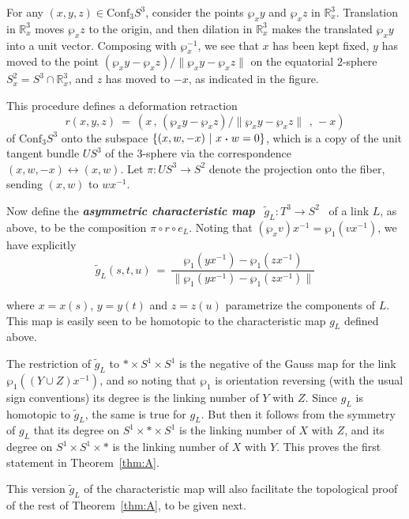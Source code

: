 \documentclass[11pt]{amsart}
\theoremstyle{definition}
\newcommand{\thmref}[1]{Theorem~\ref{#1}}
\newcommand{\itb}{\bfseries\itshape}
\def\br{\mathbb R}
\def\tor{T^3}
\def\conf{\mathrm{Conf}_3S^3}
\def\dt{\,\raisebox{.2ex}{\text{\tiny\textbullet}}\,}
\def\st{\ | \ }
\def\bx{x^{-1}} %
\def\pr{\mathrm{\wp}}
\def\g{\widetilde g}
\begin{document}
For any $(x,y,z)\in\conf$, consider the points $\pr_xy$ and $\pr_xz$ in $\br^3_x$.  Translation in $\br^3_x$ moves $\pr_xz$ to the origin, and then dilation in $\br^3_x$ makes the translated $\pr_xy$ into a unit vector.  Composing with $\pr_x^{-1}$, we see that $x$ has been kept fixed, $y$ has moved to the point $(\pr_xy-\pr_xz)/\| \pr_xy-\pr_xz\|$ on the equatorial $2$-sphere $S^2_x = S^3 \cap \br^3_x$, and $z$ has moved to $-x$, as indicated in the figure.  

This procedure defines a deformation retraction
$$
r(x,y,z) \ = \ (x \, , \, (\pr_xy-\pr_xz)/\| \pr_xy-\pr_xz\|\ \, ,\, -x)
$$
of $\conf$ onto the subspace $\{(x,w,-x) \st x \dt w = 0\}$, which is a copy of the unit tangent bundle $US^3$ of the $3$-sphere via the correspondence $(x,w,-x) \leftrightarrow (x,w)$.  Let $\pi:US^3\to S^2$ denote the projection onto the fiber, sending $(x,w)$ to $w\bx$.



Now define the {\itb asymmetric characteristic map} \ $\g_L: \tor\longrightarrow S^2$ \ of a link $L$, as above, to be the composition $\pi\circ r\circ e_L$.  Noting that $(\pr_xv)\bx = \pr_1(v\bx)$, we have explicitly
\[
\g_L(s,t,u) \ = \ \frac{\pr_1(y\bx)-\pr_1(z\bx)}{\|\pr_1(y\bx)-\pr_1(z\bx)\|}
\]

\noindent where $x = x(s)$, $y = y(t)$ and $z = z(u)$ parametrize the components of $L$.   This map is easily seen to be homotopic to the characteristic map $g_L$ defined above.   

The restriction of $\g_L$ to $*\times S^1\times S^1$ is the negative of the Gauss map for the link $\pr_1((Y\cup Z)\bx)$, and so noting that $\pr_1$ is orientation reversing (with the usual sign conventions) its degree is the linking number of $Y$ with $Z$.  Since  $g_L$  is homotopic to $\g_L$,  the same is true for $g_L$.  But then  it follows from the symmetry of $g_L$ that its degree on $S^1\times * \times S^1$ is the linking number of $X$ with $Z$,  and its degree on $S^1 \times S^1 \times *$  is the linking number of $X$ with $Y$.  This proves the first statement in  \thmref{thm:A}.

This version $\g_L$ of the characteristic map will also facilitate the topological proof of the rest of \thmref{thm:A}, to be given next.

\clearpage

\end{document}
